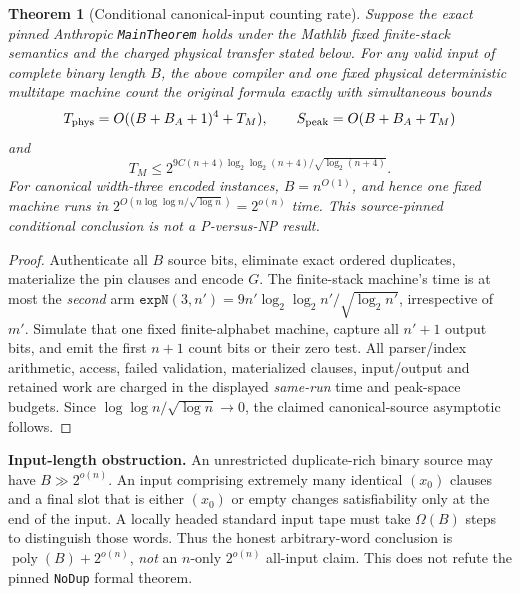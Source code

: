 \documentclass[11pt]{article}
\newtheorem{theorem}{Theorem}
\begin{document}
\begin{theorem}[Conditional canonical-input counting rate]
Suppose the exact pinned Anthropic \texttt{MainTheorem}
holds under the Mathlib fixed finite-stack semantics and the charged
physical transfer stated below. For any valid input of complete
binary length $B$, the above compiler and one fixed physical
deterministic multitape machine count the original formula exactly
with simultaneous bounds
\[
 T_{\rm phys}=O((B+B_A+1)^4+T_M),\qquad
 S_{\rm peak}=O(B+B_A+T_M)
\]
and
\[
 T_M\le
 2^{9C(n+4)\log_2\log_2(n+4)/\sqrt{\log_2(n+4)}}.
\]
For canonical width-three encoded instances, $B=n^{O(1)}$,
and hence \emph{one fixed machine} runs in
$2^{O(n\log\log n/\sqrt{\log n})}=2^{o(n)}$ time.
This source-pinned conditional conclusion is not a P-versus-NP result.
\end{theorem}
\begin{proof}
Authenticate all $B$ source bits, eliminate exact ordered duplicates,
materialize the pin clauses and encode $G$. The finite-stack
machine's time is at most the \emph{second} arm
$\texttt{expN}(3,n')=9n'\log_2\log_2n'/\sqrt{\log_2n'}$,
irrespective of $m'$. Simulate that one fixed finite-alphabet machine,
capture all $n'+1$ output bits, and emit the first $n+1$ count
bits or their zero test. All parser/index arithmetic, access, failed
validation, materialized clauses, input/output and retained work are
charged in the displayed \emph{same-run} time and peak-space budgets.
Since $\log\log n/\sqrt{\log n}\to0$, the claimed canonical-source
asymptotic follows.
\end{proof}

\noindent\textbf{Input-length obstruction.}
An unrestricted duplicate-rich binary source may have
$B\gg2^{o(n)}$. An input comprising extremely many identical
$(x_0)$ clauses and a final slot that is either $(x_0)$ or empty
changes satisfiability only at the end of the input. A locally
headed standard input tape must take $\Omega(B)$ steps to
distinguish those words. Thus the honest arbitrary-word conclusion
is $\operatorname{poly}(B)+2^{o(n)}$, \emph{not}
an $n$-only $2^{o(n)}$ all-input claim. This does not refute the
pinned \texttt{NoDup} formal theorem.
\end{document}
